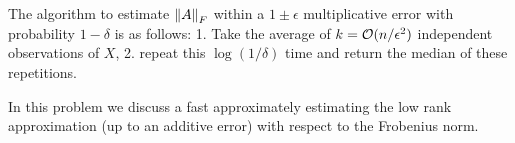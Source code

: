 \documentclass[10pt]{article}
\begin{document}
\begin{solution}[Solution]
\begin{enumerate}[label=(\alph*)]
        The algorithm to estimate \( \left\lVert A\right\rVert_F \) within a \( 1\pm \epsilon \) multiplicative error with probability \( 1-\delta \) is as follows: 1. Take the average of \( k = \mathcal{O}(n/\epsilon^2) \) independent observations of \( X \), 2. repeat this \( \log(1/\delta) \) time and return the median of these repetitions. 
        


\end{enumerate}

\end{solution}



\begin{problem}[Problem 4]
In this problem we discuss a fast approximately estimating the low rank approximation (up to an additive error) with respect to the Frobenius norm.


\end{problem}
\end{document}
